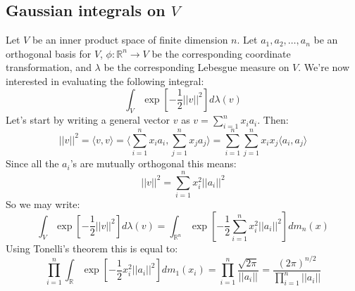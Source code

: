 \documentclass[12pt, a4paper]{article}
\numberwithin{equation}{section}
\begin{document}
\subsection{Gaussian integrals on $V$}
Let $V$ be an inner product space of finite dimension $n$. Let $a_1, a_2,\ldots, a_n$ be an orthogonal basis for $V$, $\phi:\mathbb{R}^n\rightarrow V$ be the corresponding coordinate transformation, and $\lambda$ be the corresponding Lebesgue measure on $V$. We're now interested in evaluating the following integral:
\begin{equation}
\int_V\exp\left[-\frac{1}{2}||v||^2\right]d\lambda(v)
\end{equation}
Let's start by writing a general vector $v$ as $v=\sum_{i=1}^n x_i a_i$. Then:
\begin{equation}
||v||^2=\langle v,v\rangle=\langle\sum_{i=1}^n x_i a_i,\sum_{j=1}^n x_j a_j\rangle=\sum_{i=1}^n\sum_{j=1}^n x_i x_j\langle a_i,a_j\rangle
\end{equation}
Since all the $a_i$'s are mutually orthogonal this means:
\begin{equation}
||v||^2=\sum_{i=1}^n x_i^2||a_i||^2
\end{equation}
So we may write:
\begin{equation}
\int_V\exp\left[-\frac{1}{2}||v||^2\right]d\lambda(v)=\int_{\mathbb{R}^n}\exp\left[-\frac{1}{2}\sum_{i=1}^n x_i^2||a_i||^2\right]dm_n(x)
\end{equation}
Using Tonelli's theorem this is equal to:
\begin{equation}
\prod_{i=1}^n\int_\mathbb{R}\exp\left[-\frac{1}{2}x_i^2||a_i||^2\right]dm_1(x_i)=\prod_{i=1}^n\frac{\sqrt{2\pi}}{||a_i||}=\frac{(2\pi)^{n/2}}{\prod_{i=1}^n||a_i||}
\end{equation}
\end{document}
